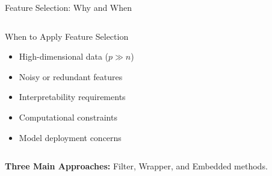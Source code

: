 \documentclass[aspectratio=169,11pt]{beamer}
\begin{document}
\begin{frame}{Feature Selection: Why and When}
\begin{columns}
\begin{column}{0.5\textwidth}
\begin{block}{When to Apply Feature Selection}
\begin{itemize}
\item High-dimensional data ($p \gg n$)
\item Noisy or redundant features
\item Interpretability requirements
\item Computational constraints
\item Model deployment concerns
\end{itemize}
\end{block}
\end{column}
\end{columns}

\textbf{Three Main Approaches:} Filter, Wrapper, and Embedded methods.
\end{frame}
\end{document}
